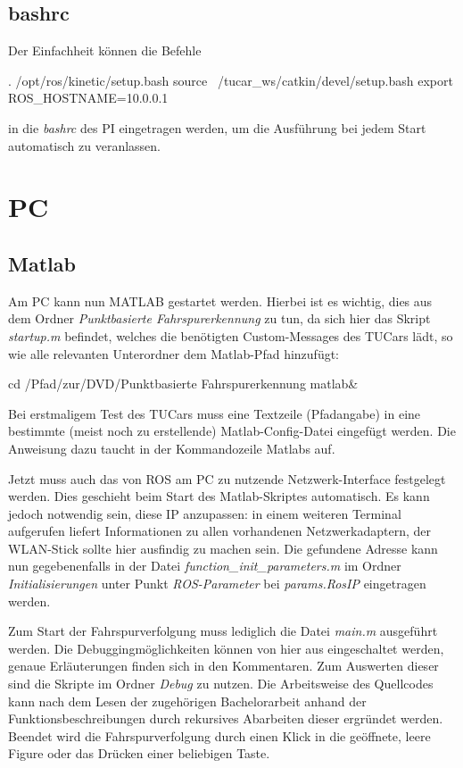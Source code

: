 \documentclass[
	11pt,			%
	a4paper,		%
	oneside,		%
	german,			%
	titlepage		%
]{scrartcl}			%
\newcommand{\sh}[1]{\mint[xleftmargin=2em]{shell}{#1}}
\begin{document}
\subsection{bashrc}
Der Einfachheit können die Befehle
\begin{she}
. /opt/ros/kinetic/setup.bash
source ~/tucar_ws/catkin/devel/setup.bash
export ROS_HOSTNAME=10.0.0.1
\end{she}
\noindent in die \emph{bashrc} des PI eingetragen werden, um die Ausführung bei jedem Start automatisch zu veranlassen.

\section{PC}
\subsection{Matlab}
\label{ssec:pc:matlab}
Am PC kann nun MATLAB gestartet werden. Hierbei ist es wichtig, dies aus dem Ordner \emph{Punktbasierte Fahrspurerkennung} zu tun, da sich hier das Skript \emph{startup.m} befindet, welches die benötigten Custom-Messages des TUCars lädt, so wie alle relevanten Unterordner dem Matlab-Pfad hinzufügt:
\begin{she}
cd /Pfad/zur/DVD/Punktbasierte Fahrspurerkennung
matlab&
\end{she}
Bei erstmaligem Test des TUCars muss eine Textzeile (Pfadangabe) in eine bestimmte (meist noch zu erstellende) Matlab-Config-Datei eingefügt werden. Die Anweisung dazu taucht in der Kommandozeile Matlabs auf. 

Jetzt muss auch das von ROS am PC zu nutzende Netzwerk-Interface festgelegt werden. Dies geschieht beim Start des Matlab-Skriptes automatisch. Es kann jedoch notwendig sein, diese IP anzupassen:
\sh{ifconfig} 
\noindent in einem weiteren Terminal aufgerufen liefert Informationen zu allen vorhandenen Netzwerkadaptern, der WLAN-Stick sollte hier ausfindig zu machen sein.
Die gefundene Adresse kann nun gegebenenfalls in der Datei \emph{function\_init\_parameters.m} im Ordner \emph{Initialisierungen} unter Punkt \emph{ROS-Parameter} bei \emph{params.RosIP} eingetragen werden.

Zum Start der Fahrspurverfolgung muss lediglich die Datei \emph{main.m} ausgeführt werden. Die Debuggingmöglichkeiten können von hier aus eingeschaltet werden, genaue Erläuterungen finden sich in den Kommentaren. Zum Auswerten dieser sind die Skripte im Ordner \emph{Debug} zu nutzen. Die Arbeitsweise des Quellcodes kann nach dem Lesen der zugehörigen Bachelorarbeit anhand der Funktionsbeschreibungen durch rekursives Abarbeiten dieser ergründet werden. Beendet wird die Fahrspurverfolgung durch einen Klick in die geöffnete, leere Figure oder das Drücken einer beliebigen Taste.
\end{document}
